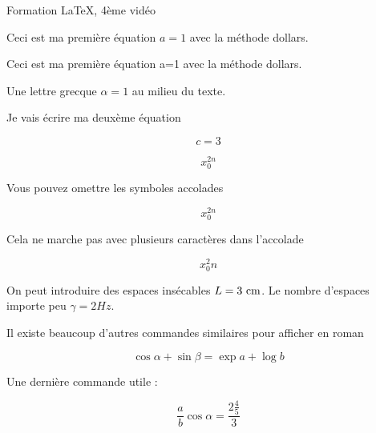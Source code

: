 \documentclass[a4paper]{report}
\begin{document}
Formation \LaTeX, 4ème vidéo

Ceci est ma première équation $a=1$ avec la méthode dollars.

Ceci est ma première équation a=1 avec la méthode dollars.

Une lettre grecque $\alpha=1$ au milieu du texte.

Je vais écrire ma deuxème équation

\begin{equation}
c=3
\end{equation}



\begin{equation}
x_{0}^{2n}
\end{equation}

Vous pouvez omettre les symboles accolades

\begin{equation}
x_0^{2n}
\end{equation}


Cela ne marche pas avec plusieurs caractères dans l'accolade

\begin{equation}
x_0^2n
\end{equation}

On peut introduire des espaces insécables $L=3~ \rm cm$. Le nombre d'espaces importe peu $\gamma =          2 Hz$.

Il existe beaucoup d'autres commandes similaires pour afficher en roman

\begin{equation}
\cos\alpha +\sin\beta = \exp a + \log b
\end{equation}

Une dernière commande utile :

\begin{equation}
\frac{a}{b}\cos\alpha=\frac{2\frac{4}{5}}{3}
\end{equation}
\end{document}
